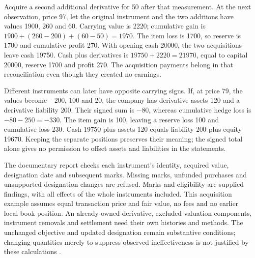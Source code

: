 Acquire a second additional derivative for 50 after that measurement. At the next
observation, price 97, let the original instrument and the two additions have values
1900, 260 and 60. Carrying value is 2220; cumulative gain is
$1900+(260-200)+(60-50)=1970$. The item loss is 1700, so reserve is 1700
and cumulative profit 270. With opening cash 20000, the two acquisitions leave
cash 19750. Cash plus derivatives is $19750+2220=21970$, equal to capital
20000, reserve 1700 and profit 270. The acquisition payments belong in that
reconciliation even though they created no earnings.

Different instruments can later have opposite carrying signs. If, at price
79, the values become $-200$, 100 and 20, the company has derivative assets
120 and a derivative liability 200. Their signed sum is $-80$, whereas
cumulative hedge loss is $-80-250=-330$. The item gain is 100, leaving a
reserve loss 100 and cumulative loss 230. Cash 19750 plus assets 120 equals
liability 200 plus equity 19670. Keeping the separate positions preserves
their meaning; the signed total alone gives no permission to offset assets
and liabilities in the statements.

The documentary  report checks each instrument's
identity, acquired value, designation date and subsequent marks. Missing marks,
unfunded purchases and unsupported designation changes are refused. Marks and
eligibility are supplied findings, with all effects of the whole instruments
included. This acquisition example assumes equal transaction price and fair
value, no fees and no earlier local book position. An already-owned derivative,
excluded valuation components, instrument removals and settlement need their
own histories and methods. The unchanged objective and updated designation
remain substantive conditions; changing quantities merely to suppress observed
ineffectiveness is not justified by these calculations
\citep[IFRS~9, paragraphs 6.2.1--6.2.6, B6.5.12--15 and B6.5.21]{eu20231803}.
